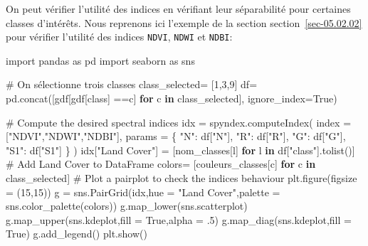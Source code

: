 \documentclass[
  french,
  11pt,
  letterpaper,
  open=any,
  twoside=false,
  french]{scrbook}
\newenvironment{Shaded}{\begin{snugshade}}{\end{snugshade}}
\newcommand{\CommentTok}[1]{\textcolor[rgb]{0.37,0.37,0.37}{#1}}
\newcommand{\ControlFlowTok}[1]{\textcolor[rgb]{0.00,0.23,0.31}{\textbf{#1}}}
\newcommand{\DecValTok}[1]{\textcolor[rgb]{0.68,0.00,0.00}{#1}}
\newcommand{\FloatTok}[1]{\textcolor[rgb]{0.68,0.00,0.00}{#1}}
\newcommand{\ImportTok}[1]{\textcolor[rgb]{0.00,0.46,0.62}{#1}}
\newcommand{\KeywordTok}[1]{\textcolor[rgb]{0.00,0.23,0.31}{\textbf{#1}}}
\newcommand{\NormalTok}[1]{\textcolor[rgb]{0.00,0.23,0.31}{#1}}
\newcommand{\OperatorTok}[1]{\textcolor[rgb]{0.37,0.37,0.37}{#1}}
\newcommand{\StringTok}[1]{\textcolor[rgb]{0.13,0.47,0.30}{#1}}
\newcommand{\VariableTok}[1]{\textcolor[rgb]{0.07,0.07,0.07}{#1}}
\begin{document}
On peut vérifier l'utilité des indices en vérifiant leur séparabilité
pour certaines classes d'intérêts. Nous reprenons ici l'exemple de la
section section~\ref{sec-05.02.02} pour vérifier l'utilité des indices
\texttt{NDVI}, \texttt{NDWI} et \texttt{NDBI}:

\begin{Shaded}
\begin{Highlighting}[]
\ImportTok{import}\NormalTok{ pandas }\ImportTok{as}\NormalTok{ pd}
\ImportTok{import}\NormalTok{ seaborn }\ImportTok{as}\NormalTok{ sns}

\CommentTok{\# On sélectionne trois classes}
\NormalTok{class\_selected}\OperatorTok{=}\NormalTok{ [}\DecValTok{1}\NormalTok{,}\DecValTok{3}\NormalTok{,}\DecValTok{9}\NormalTok{]}
\NormalTok{df}\OperatorTok{=}\NormalTok{ pd.concat([gdf[gdf[}\StringTok{\textquotesingle{}class\textquotesingle{}}\NormalTok{] }\OperatorTok{==}\NormalTok{c] }\ControlFlowTok{for}\NormalTok{ c }\KeywordTok{in}\NormalTok{ class\_selected], ignore\_index}\OperatorTok{=}\VariableTok{True}\NormalTok{)}

\CommentTok{\# Compute the desired spectral indices}
\NormalTok{idx }\OperatorTok{=}\NormalTok{ spyndex.computeIndex(}
\NormalTok{    index }\OperatorTok{=}\NormalTok{ [}\StringTok{"NDVI"}\NormalTok{,}\StringTok{"NDWI"}\NormalTok{,}\StringTok{"NDBI"}\NormalTok{],}
\NormalTok{    params }\OperatorTok{=}\NormalTok{ \{}
        \StringTok{"N"}\NormalTok{: df[}\StringTok{"N"}\NormalTok{],}
        \StringTok{"R"}\NormalTok{: df[}\StringTok{"R"}\NormalTok{],}
        \StringTok{"G"}\NormalTok{: df[}\StringTok{"G"}\NormalTok{],}
        \StringTok{"S1"}\NormalTok{: df[}\StringTok{"S1"}\NormalTok{]}
\NormalTok{    \}}
\NormalTok{)}
\NormalTok{idx[}\StringTok{"Land Cover"}\NormalTok{] }\OperatorTok{=}\NormalTok{ [nom\_classes[l] }\ControlFlowTok{for}\NormalTok{ l }\KeywordTok{in}\NormalTok{ df[}\StringTok{"class"}\NormalTok{].tolist()] }\CommentTok{\# Add Land Cover to DataFrame}
\NormalTok{colors}\OperatorTok{=}\NormalTok{ [couleurs\_classes[c] }\ControlFlowTok{for}\NormalTok{ c }\KeywordTok{in}\NormalTok{ class\_selected]}
\CommentTok{\# Plot a pairplot to check the indices behaviour}
\NormalTok{plt.figure(figsize }\OperatorTok{=}\NormalTok{ (}\DecValTok{15}\NormalTok{,}\DecValTok{15}\NormalTok{))}
\NormalTok{g }\OperatorTok{=}\NormalTok{ sns.PairGrid(idx,hue }\OperatorTok{=} \StringTok{"Land Cover"}\NormalTok{,palette }\OperatorTok{=}\NormalTok{ sns.color\_palette(colors))}
\NormalTok{g.map\_lower(sns.scatterplot)}
\NormalTok{g.map\_upper(sns.kdeplot,fill }\OperatorTok{=} \VariableTok{True}\NormalTok{,alpha }\OperatorTok{=} \FloatTok{.5}\NormalTok{)}
\NormalTok{g.map\_diag(sns.kdeplot,fill }\OperatorTok{=} \VariableTok{True}\NormalTok{)}
\NormalTok{g.add\_legend()}
\NormalTok{plt.show()}
\end{Highlighting}
\end{Shaded}
\end{document}
